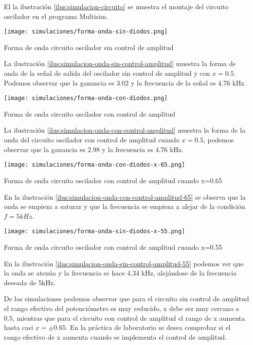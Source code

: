 El la ilustración \ref{ilus:simulacion-circuito} se muestra el montaje del circuito oscilador en el programa Multisim.

\begin{ilustracion}[ht]
    \centering
    \texttt{[image: simulaciones/forma-onda-sin-diodos.png]}
    \caption{Forma de onda circuito oscilador sin control de amplitud}
    \label{ilus:simulacion-onda-sin-control-amplitud}
\end{ilustracion}

La ilustración \ref{ilus:simulacion-onda-sin-control-amplitud} muestra la forma de onda de la señal de salida del oscilador sin control de amplitud y con $x=0.5$. Podemos observar que la ganancia es 3.02 y la frecuencia de la señal es 4.76 kHz.

\begin{ilustracion}[ht]
    \centering
    \texttt{[image: simulaciones/forma-onda-con-diodos.png]}
    \caption{Forma de onda circuito oscilador con control de amplitud}
    \label{ilus:simulacion-onda-con-control-amplitud}
\end{ilustracion}

La ilustración \ref{ilus:simulacion-onda-con-control-amplitud} muestra la forma de la onda del circuito oscilador con control de amplitud cuando $x = 0.5$, podemos observar que la ganancia es 2.98 y la frecuencia es 4.76 kHz.


\begin{ilustracion}[ht]
    \centering
    \texttt{[image: simulaciones/forma-onda-con-diodos-x-65.png]}
    \caption{Forma de onda circuito oscilador con control de amplitud cuando x=0.65}
    \label{ilus:simulacion-onda-con-control-amplitud-65}
\end{ilustracion}

En la ilustración \ref{ilus:simulacion-onda-con-control-amplitud-65} se observa que la onda se empieza a saturar y que la frecuencia se empieza a alejar de la condición $f=5kHz$.

\begin{ilustracion}[ht]
    \centering
    \texttt{[image: simulaciones/forma-onda-sin-diodos-x-55.png]}
    \caption{Forma de onda circuito oscilador con control de amplitud cuando x=0.55}
    \label{ilus:simulacion-onda-sin-control-amplitud-55}
\end{ilustracion}

En la ilustración \ref{ilus:simulacion-onda-sin-control-amplitud-55} podemos ver que la onda se atenúa y la frecuencia se hace 4.34 kHz, alejándose de la frecuencia deseada de 5kHz.

De las simulaciones podemos observar que para el circuito sin control de amplitud el rango efectivo del potenciómetro es muy reducido, x debe ser muy cercano a 0.5, mientras que para el circuito con control de amplitud el rango de x aumenta hasta casi $x = \pm 0.65$. En la práctica de laboratorio se desea comprobar si el rango efectivo de x aumenta cuando se implementa el control de amplitud.